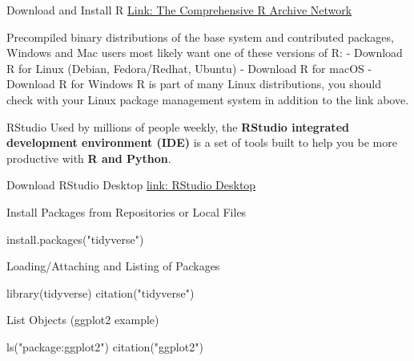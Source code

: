 \documentclass[
  ignorenonframetext,
]{beamer}
\newenvironment{Shaded}{\begin{snugshade}}{\end{snugshade}}
\newcommand{\FunctionTok}[1]{\textcolor[rgb]{0.94,0.94,0.56}{#1}}
\newcommand{\NormalTok}[1]{\textcolor[rgb]{0.80,0.80,0.80}{#1}}
\newcommand{\StringTok}[1]{\textcolor[rgb]{0.80,0.58,0.58}{#1}}
\begin{document}
\begin{frame}{Download and Install R}
\protect\hypertarget{download-and-install-r}{}
\href{https://brieger.esalq.usp.br/CRAN/}{Link: The Comprehensive R
Archive Network}

Precompiled binary distributions of the base system and contributed
packages, Windows and Mac users most likely want one of these versions
of R: - Download R for Linux (Debian, Fedora/Redhat, Ubuntu) - Download
R for macOS - Download R for Windows R is part of many Linux
distributions, you should check with your Linux package management
system in addition to the link above.
\end{frame}

\begin{frame}{RStudio}
\protect\hypertarget{rstudio}{}
Used by millions of people weekly, the \textbf{RStudio integrated
development environment (IDE)} is a set of tools built to help you be
more productive with \textbf{R and Python}.
\end{frame}

\begin{frame}{Download RStudio Desktop}
\protect\hypertarget{download-rstudio-desktop}{}
\href{https://posit.co/download/rstudio-desktop/}{link: RStudio Desktop}
\end{frame}

\begin{frame}[fragile]{Install Packages from Repositories or Local
Files}
\protect\hypertarget{install-packages-from-repositories-or-local-files}{}
\begin{Shaded}
\begin{Highlighting}[]
\FunctionTok{install.packages}\NormalTok{(}\StringTok{"tidyverse"}\NormalTok{)}
\end{Highlighting}
\end{Shaded}
\end{frame}

\begin{frame}[fragile]{Loading/Attaching and Listing of Packages}
\protect\hypertarget{loadingattaching-and-listing-of-packages}{}
\begin{Shaded}
\begin{Highlighting}[]
\FunctionTok{library}\NormalTok{(tidyverse)}
\FunctionTok{citation}\NormalTok{(}\StringTok{"tidyverse"}\NormalTok{)}
\end{Highlighting}
\end{Shaded}
\end{frame}

\begin{frame}[fragile]{List Objects (ggplot2 example)}
\protect\hypertarget{list-objects-ggplot2-example}{}
\begin{Shaded}
\begin{Highlighting}[]
\FunctionTok{ls}\NormalTok{(}\StringTok{"package:ggplot2"}\NormalTok{)}
\FunctionTok{citation}\NormalTok{(}\StringTok{"ggplot2"}\NormalTok{)}
\end{Highlighting}
\end{Shaded}
\end{frame}
\end{document}
